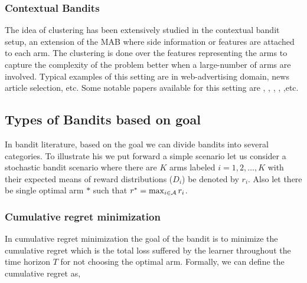 \subsubsection{Contextual Bandits}

The idea of clustering has been extensively studied in the contextual bandit setup, an extension of the MAB where side information or features are attached to each arm. The clustering is done over the features representing the arms to capture the complexity of the problem better when a large-number of arms are involved. Typical examples of this setting are in web-advertising domain, news article selection, etc. Some notable papers available for this setting are   \citet{auer2002using}, \citet{langford2008epoch}, \citet{li2010contextual}, \citet{beygelzimer2011contextual}, \citet{slivkins2014contextual},etc. 


%





\subsection{Types of Bandits based on goal}

In bandit literature, based on the goal we can divide bandits into several categories. To illustrate his we put forward a simple scenario let us consider a stochastic bandit scenario where there are $K$ arms labeled $i=1,2,\ldots,K$ with their expected means of reward distributions ($D_i$) be denoted by $r_i$. Also let there be single optimal arm $*$ such that $r^* = \max_{i\in\mathcal{A}}r_i$. 



\subsubsection{Cumulative regret minimization}
In cumulative regret minimization the goal of the bandit is to minimize the cumulative regret which is the total loss suffered by the learner throughout the time horizon $T$ for not choosing the optimal arm. Formally, we can define the cumulative regret as,

